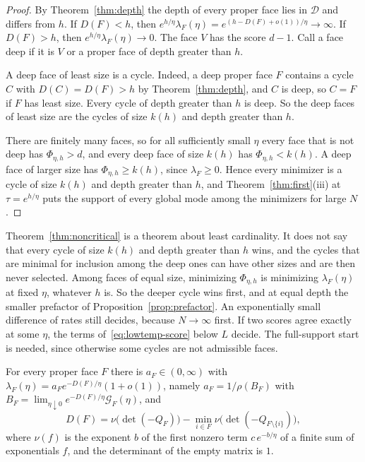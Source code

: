 \begin{proof}
By Theorem~\ref{thm:depth} the depth of every proper face lies in $\mathcal D$
and differs from $h$. If $D(F)<h$, then
$e^{h/\eta}\lambda_F(\eta)=e^{(h-D(F)+o(1))/\eta}\to\infty$. If $D(F)>h$, then
$e^{h/\eta}\lambda_F(\eta)\to0$. The face $V$ has the score $d-1$. Call a face
deep if it is $V$ or a proper face of depth greater than $h$.

A deep face of least size is a cycle. Indeed, a deep proper face $F$ contains a
cycle $C$ with $D(C)=D(F)>h$ by Theorem~\ref{thm:depth}, and $C$ is deep, so
$C=F$ if $F$ has least size. Every cycle of depth greater than $h$ is deep. So
the deep faces of least size are the cycles of size $k(h)$ and depth greater
than $h$.

There are finitely many faces, so for all sufficiently small $\eta$ every face
that is not deep has $\Phi_{\eta,h}>d$, and every deep face of size $k(h)$ has
$\Phi_{\eta,h}<k(h)$. A deep face of larger size has $\Phi_{\eta,h}\ge k(h)$,
since $\lambda_F\ge0$. Hence every minimizer is a cycle of size $k(h)$ and
depth greater than $h$, and Theorem~\ref{thm:first}(iii) at $\tau=e^{h/\eta}$
puts the support of every global mode among the minimizers for large $N$.
\end{proof}

Theorem~\ref{thm:noncritical} is a theorem about least cardinality. It does
not say that every cycle of size $k(h)$ and depth greater than $h$ wins, and
the cycles that are minimal for inclusion among the deep ones can have other
sizes and are then never selected. Among faces of equal size, minimizing
$\Phi_{\eta,h}$ is minimizing $\lambda_F(\eta)$ at fixed $\eta$, whatever $h$
is. So the deeper cycle wins first, and at equal depth the smaller prefactor of
Proposition~\ref{prop:prefactor}. An exponentially small difference of rates
still decides, because $N\to\infty$ first. If two scores agree exactly at some
$\eta$, the terms of~\eqref{eq:lowtemp-score} below $L$ decide. The
full-support start is needed, since otherwise some cycles are not admissible
faces.

\begin{proposition}[prefactors]\label{prop:prefactor}
For every proper face $F$ there is $a_F\in(0,\infty)$ with
$\lambda_F(\eta)=a_Fe^{-D(F)/\eta}(1+o(1))$, namely $a_F=1/\rho(B_F)$ with
$B_F=\lim_{\eta\downarrow0}e^{-D(F)/\eta}\mathcal G_F(\eta)$, and
\[
 D(F)=\nu\bigl(\det(-Q_F)\bigr)-\min_{i\in F}\nu\bigl(\det(-Q_{F\setminus\{i\}})\bigr),
\]
where $\nu(f)$ is the exponent $b$ of the first nonzero term $c\,e^{-b/\eta}$
of a finite sum of exponentials $f$, and the determinant of the empty matrix
is $1$.
\end{proposition}

